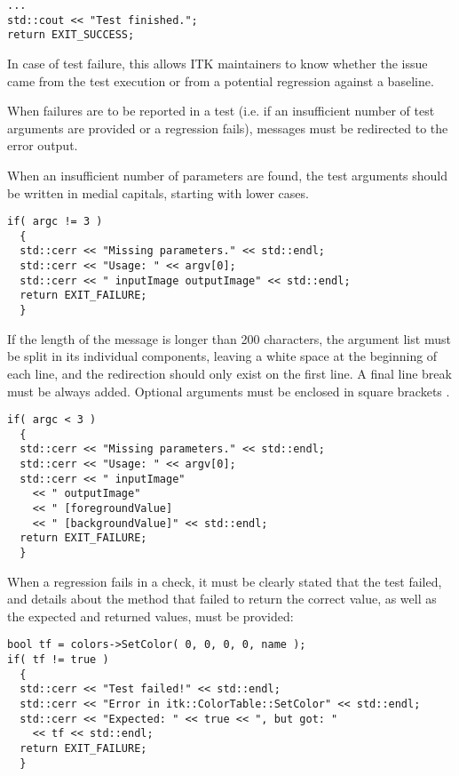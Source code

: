 \small
\begin{verbatim}
...
std::cout << "Test finished.";
return EXIT_SUCCESS;
\end{verbatim}
\normalsize

In case of test failure, this allows ITK maintainers to know whether the issue
came from the test execution or from a potential regression against a baseline.

When failures are to be reported in a test (i.e. if an insufficient number of
test arguments are provided or a regression fails), messages must be redirected
to the error output.

When an insufficient number of parameters are found, the test arguments should
be written in medial capitals, starting with lower cases.

\small
\begin{verbatim}
if( argc != 3 )
  {
  std::cerr << "Missing parameters." << std::endl;
  std::cerr << "Usage: " << argv[0];
  std::cerr << " inputImage outputImage" << std::endl;
  return EXIT_FAILURE;
  }
\end{verbatim}
\normalsize

If the length of the message is longer than 200 characters, the argument list
must be split in its individual components, leaving a white space at the
beginning of each line, and the  redirection should only
exist on the first line. A final line break must be always added. Optional
arguments must be enclosed in square brackets \code{[]}.

\small
\begin{verbatim}
if( argc < 3 )
  {
  std::cerr << "Missing parameters." << std::endl;
  std::cerr << "Usage: " << argv[0];
  std::cerr << " inputImage"
    << " outputImage"
    << " [foregroundValue]
    << " [backgroundValue]" << std::endl;
  return EXIT_FAILURE;
  }
\end{verbatim}
\normalsize

When a regression fails in a check, it must be clearly stated that the test
failed, and details about the method that failed to return the correct value,
as well as the expected and returned values, must be provided:

\small
\begin{verbatim}
bool tf = colors->SetColor( 0, 0, 0, 0, name );
if( tf != true )
  {
  std::cerr << "Test failed!" << std::endl;
  std::cerr << "Error in itk::ColorTable::SetColor" << std::endl;
  std::cerr << "Expected: " << true << ", but got: "
    << tf << std::endl;
  return EXIT_FAILURE;
  }
\end{verbatim}
\normalsize

